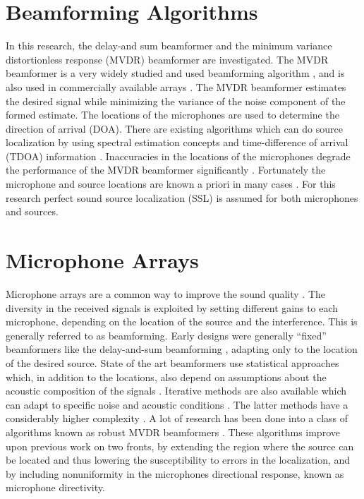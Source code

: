 \section{Beamforming Algorithms}
\label{sec:intro_alg}
In this research, the delay-and sum beamformer and the minimum variance distortionless response (MVDR) beamformer are investigated. The MVDR beamformer is a very widely studied and used beamforming algorithm \citep{habetsspeech2010}, and is also used in commercially available arrays \citep{pentek2015}. The MVDR beamformer estimates the desired signal while minimizing the variance of the noise component of the formed estimate. The locations of the microphones are used to determine the direction of arrival (DOA). There are existing algorithms which can do source localization by using spectral estimation concepts and time-difference of arrival (TDOA) information \citep{brandstein2001}. Inaccuracies in the locations of the microphones degrade the performance of the MVDR beamformer significantly \citep{vanveen1988, ehrenberg2010}. Fortunately the microphone and source locations are known a priori in many cases \citep{himawan2011}. For this research perfect sound source localization (SSL) is assumed for both microphones and sources.

\section{Microphone Arrays}
\label{sec:intro_arrays}
Microphone arrays are a common way to improve the sound quality \citep{brandstein2001}. The diversity in the received signals is exploited by setting different gains to each microphone, depending on the location of the source and the interference. This is generally referred to as beamforming. Early designs were generally “fixed” beamformers like the delay-and-sum beamforming \cite{naylor2010speech}, adapting only to the location of the desired source. State of the art beamformers use statistical approaches which, in addition to the locations, also depend on assumptions about the acoustic composition of the signals \cite{gaubitch2014}. Iterative methods are also available which can adapt to specific noise and acoustic conditions \cite{griffiths1982,ba2007}. The latter methods have a considerably higher complexity \citep{kjellson2014sound}. \newline
A lot of research has been done into a class of algorithms known as robust MVDR beamformers \citep{ba2007,habets2010,martinez2015}. These algorithms improve upon previous work on two fronts, by extending the region where the source can be located and thus lowering the susceptibility to errors in the localization, and by including nonuniformity in the microphones directional response, known as microphone directivity.

